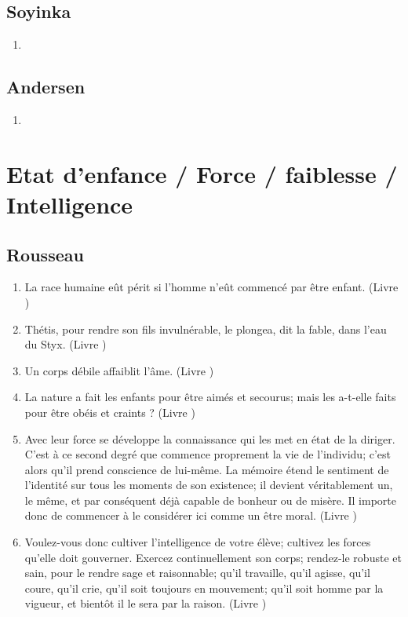 \documentclass[a4paper, 11pt, hidelinks]{article}
\newcommand{\rb}[1]{\Romanbar{#1}}
\begin{document}
\subsection{Soyinka}


\begin{enumerate}
    \item 
\end{enumerate}




\subsection{Andersen}


\begin{enumerate}
    \item 
\end{enumerate}










\section{Etat d'enfance / Force / faiblesse / Intelligence}



\subsection{Rousseau}


\begin{enumerate}
    \item La race humaine eût périt si l'homme n'eût commencé par être enfant. (Livre \rb{1})
    \item Thétis, pour rendre son fils invulnérable, le plongea, dit la fable, dans l'eau du Styx. (Livre \rb{1})
    \item Un corps débile affaiblit l'âme. (Livre \rb{1})
    \item La nature a fait les enfants pour être aimés et secourus; mais les a-t-elle faits pour être obéis et craints ? (Livre \rb{2})
    \item Avec leur force se développe la connaissance qui les met en état de la diriger. C'est à ce second degré que commence proprement la vie de l'individu; c'est alors qu'il prend conscience de lui-même. La mémoire étend le sentiment de l'identité sur tous les moments de son existence; il devient véritablement un, le même, et par conséquent déjà capable de bonheur ou de misère. Il importe donc de commencer à le considérer ici comme un être moral. (Livre \rb{2})
    \item Voulez-vous donc cultiver l'intelligence de votre élève; cultivez les forces qu'elle doit gouverner. Exercez continuellement son corps; rendez-le robuste et sain, pour le rendre sage et raisonnable; qu'il travaille, qu'il agisse, qu'il coure, qu'il crie, qu'il soit toujours en mouvement; qu'il soit homme par la vigueur, et bientôt il le sera par la raison. (Livre \rb{2})
\end{enumerate}
\end{document}

